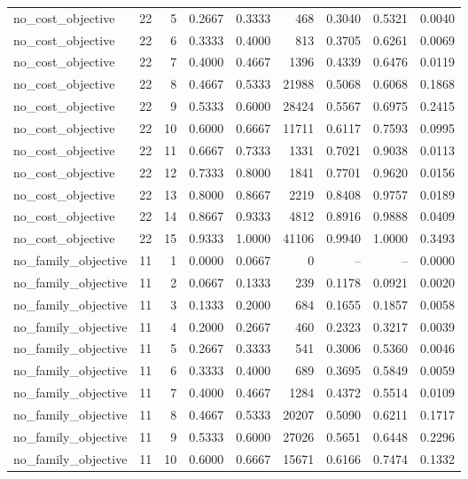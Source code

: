 \begin{tabular}{lrrrrrrrr}
no\_cost\_objective & 22 & 5 & 0.2667 & 0.3333 & 468 & 0.3040 & 0.5321 & 0.0040 \\
no\_cost\_objective & 22 & 6 & 0.3333 & 0.4000 & 813 & 0.3705 & 0.6261 & 0.0069 \\
no\_cost\_objective & 22 & 7 & 0.4000 & 0.4667 & 1396 & 0.4339 & 0.6476 & 0.0119 \\
no\_cost\_objective & 22 & 8 & 0.4667 & 0.5333 & 21988 & 0.5068 & 0.6068 & 0.1868 \\
no\_cost\_objective & 22 & 9 & 0.5333 & 0.6000 & 28424 & 0.5567 & 0.6975 & 0.2415 \\
no\_cost\_objective & 22 & 10 & 0.6000 & 0.6667 & 11711 & 0.6117 & 0.7593 & 0.0995 \\
no\_cost\_objective & 22 & 11 & 0.6667 & 0.7333 & 1331 & 0.7021 & 0.9038 & 0.0113 \\
no\_cost\_objective & 22 & 12 & 0.7333 & 0.8000 & 1841 & 0.7701 & 0.9620 & 0.0156 \\
no\_cost\_objective & 22 & 13 & 0.8000 & 0.8667 & 2219 & 0.8408 & 0.9757 & 0.0189 \\
no\_cost\_objective & 22 & 14 & 0.8667 & 0.9333 & 4812 & 0.8916 & 0.9888 & 0.0409 \\
no\_cost\_objective & 22 & 15 & 0.9333 & 1.0000 & 41106 & 0.9940 & 1.0000 & 0.3493 \\
no\_family\_objective & 11 & 1 & 0.0000 & 0.0667 & 0 & -- & -- & 0.0000 \\
no\_family\_objective & 11 & 2 & 0.0667 & 0.1333 & 239 & 0.1178 & 0.0921 & 0.0020 \\
no\_family\_objective & 11 & 3 & 0.1333 & 0.2000 & 684 & 0.1655 & 0.1857 & 0.0058 \\
no\_family\_objective & 11 & 4 & 0.2000 & 0.2667 & 460 & 0.2323 & 0.3217 & 0.0039 \\
no\_family\_objective & 11 & 5 & 0.2667 & 0.3333 & 541 & 0.3006 & 0.5360 & 0.0046 \\
no\_family\_objective & 11 & 6 & 0.3333 & 0.4000 & 689 & 0.3695 & 0.5849 & 0.0059 \\
no\_family\_objective & 11 & 7 & 0.4000 & 0.4667 & 1284 & 0.4372 & 0.5514 & 0.0109 \\
no\_family\_objective & 11 & 8 & 0.4667 & 0.5333 & 20207 & 0.5090 & 0.6211 & 0.1717 \\
no\_family\_objective & 11 & 9 & 0.5333 & 0.6000 & 27026 & 0.5651 & 0.6448 & 0.2296 \\
no\_family\_objective & 11 & 10 & 0.6000 & 0.6667 & 15671 & 0.6166 & 0.7474 & 0.1332 \\

\end{tabular}
